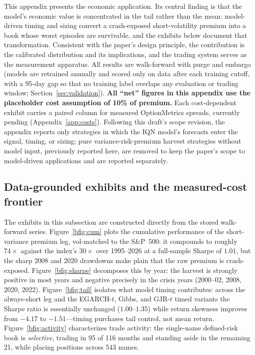 \documentclass[11pt]{article}
\begin{document}
This appendix presents the economic application. Its central finding is that the model's economic value is concentrated in the tail rather than the mean: model-driven timing and sizing convert a crash-exposed short-volatility premium into a book whose worst episodes are survivable, and the exhibits below document that transformation. Consistent with the paper's design principle, the contribution is the calibrated distribution and its implications, and the trading system serves as the measurement apparatus. All results are walk-forward with purge and embargo (models are retrained annually and scored only on data after each training cutoff, with a 95-day gap so that no training label overlaps any evaluation or trading window; Section~\ref{sec:validation}). \textbf{All ``net'' figures in this appendix use the placeholder cost assumption of 10\% of premium.} Each cost-dependent exhibit carries a paired column for measured OptionMetrics spreads, currently pending (Appendix~\ref{app:costs}). Following this draft's scope revision, the appendix reports only strategies in which the IQN model's forecasts enter the signal, timing, or sizing; pure variance-risk-premium harvest strategies without model input, previously reported here, are removed to keep the paper's scope to model-driven applications and are reported separately.

\subsection{Data-grounded exhibits and the measured-cost frontier}\label{app:exhibits}
The exhibits in this subsection are constructed directly from the stored walk-forward series. Figure~\ref{bfig:cum} plots the cumulative performance of the short-variance premium leg, vol-matched to the S\&P~500: it compounds to roughly $74\times$ against the index's $30\times$ over 1995--2026 at a full-sample Sharpe of $1.01$, but the sharp 2008 and 2020 drawdowns make plain that the raw premium is crash-exposed. Figure~\ref{bfig:sharpe} decomposes this by year: the harvest is strongly positive in most years and negative precisely in the crisis years (2000--02, 2008, 2020, 2022). Figure~\ref{bfig:tail} isolates what model timing contributes: across the always-short leg and the EGARCH-$t$, Gibbs, and GJR-$t$ timed variants the Sharpe ratio is essentially unchanged ($1.00$--$1.35$) while return skewness improves from $-4.17$ to $-1.51$---timing purchases tail control, not mean return. Figure~\ref{bfig:activity} characterizes trade activity: the single-name defined-risk book is \emph{selective}, trading in 95 of 116 months and standing aside in the remaining 21, while placing positions across 543 names.
\end{document}
